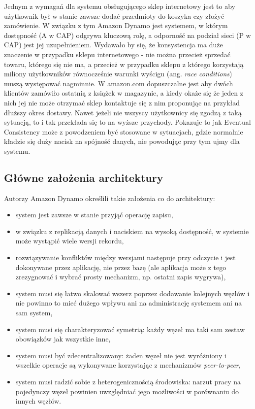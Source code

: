 Jednym z wymagań dla systemu obsługującego sklep internetowy jest to aby użytkownik był w stanie zawsze dodać przedmioty do koszyka czy złożyć zamówienie.
W związku z tym Amazon Dynamo jest systemem, w którym dostępność (A w CAP) odgrywa kluczową rolę, a odporność na podział sieci (P w CAP) jest jej uzupełnieniem.
Wydawało by się, że konsystencja ma duże znaczenie w przypadku sklepu internetowego - nie można przecież sprzedać towaru, którego się nie ma, a przecież w przypadku sklepu z którego korzystają miliony użytkowników równocześnie warunki wyścigu (ang. \emph{race conditions}) muszą występować nagminnie.
W amazon.com dopuszczalne jest aby dwóch klientów zamówiło ostatnią z książek w magazynie, a kiedy okaże się że jeden z nich jej nie może otrzymać sklep kontaktuje się z nim proponując na przykład dłuższy okres dostawy.
Nawet jeżeli nie wszyscy użytkownicy się zgodzą z taką sytuacją, to i tak przekłada się to na wyższe przychody.
Pokazuje to jak Eventual Consistency może z powodzeniem być stosowane w sytuacjach, gdzie normalnie kładzie się duży nacisk na spójność danych, nie powodując przy tym ujmy dla systemu.

\subsection*{Główne założenia architektury}

Autorzy Amazon Dynamo określili takie założenia co do architektury:

\begin{itemize}
 \item system jest zawsze w stanie przyjąć operację zapisu,
 \item w związku z replikacją danych i naciskiem na wysoką dostępność, w systemie może wystąpić wiele wersji rekordu,
 \item rozwiązywanie konfliktów między wersjami następuje przy odczycie i jest dokonywane przez aplikację, nie przez bazę (ale aplikacja może z tego zrezygnować i wybrać prosty mechanizm, np. ostatni zapis wygrywa),
 \item system musi się łatwo skalować wszerz poprzez dodawanie kolejnych węzłów i nie powinno to mieć dużego wpływu ani na administrację systemem ani na sam system,
 \item system musi się charakteryzować symetrią: każdy węzeł ma taki sam zestaw obowiązków jak wszystkie inne,
 \item system musi być zdecentralizowany: żaden węzeł nie jest wyróżniony i wszelkie operacje są wykonywane korzystając z mechanizmów \emph{peer-to-peer},
 \item system musi radzić sobie z heterogenicznością środowiska: narzut pracy na pojedynczy węzeł powinien uwzględniać jego możliwości w porównaniu do innych węzłów.
\end{itemize}

